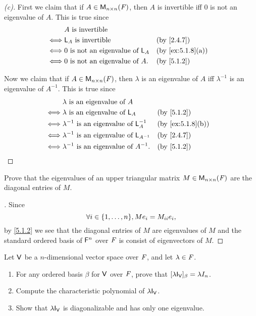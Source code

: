 \begin{proof}[(c)]
	First we claim that if \(A \in \mathsf{M}_{{n} \times n}({\mathit{F}})\), then \(A\) is invertible iff \(0\) is not an eigenvalue of \(A\).
	This is true since
	\begin{align*}
		     & A \text{ is invertible}                                       \\
		\iff & \L_A \text{ is invertible}              &  & \by{2.4.7}       \\
		\iff & 0 \text{ is not an eigenvalue of } \L_A &  & \by{ex:5.1.8}[a] \\
		\iff & 0 \text{ is not an eigenvalue of } A.   &  & \by{5.1.2}
	\end{align*}

	Now we claim that if \(A \in \mathsf{M}_{{n} \times n}({\mathit{F}})\), then \(\lambda\) is an eigenvalue of \(A\) iff \(\lambda^{-1}\) is an eigenvalue of \(A^{-1}\).
	This is true since
	\begin{align*}
		     & \lambda \text{ is an eigenvalue of } A                                      \\
		\iff & \lambda \text{ is an eigenvalue of } \L_A             &  & \by{5.1.2}       \\
		\iff & \lambda^{-1} \text{ is an eigenvalue of } \L_A^{-1}   &  & \by{ex:5.1.8}[b] \\
		\iff & \lambda^{-1} \text{ is an eigenvalue of } \L_{A^{-1}} &  & \by{2.4.7}       \\
		\iff & \lambda^{-1} \text{ is an eigenvalue of } A^{-1}.     &  & \by{5.1.2}
	\end{align*}
\end{proof}

\begin{ex}\label{ex:5.1.9}
	Prove that the eigenvalues of an upper triangular matrix \(M \in \mathsf{M}_{{n} \times n}({\mathit{F}})\) are the diagonal entries of \(M\).
\end{ex}

\begin{proof}[]
	Since
	\[
		\forall i \in \set{1, \dots, n}, M e_i = M_{i i} e_i,
	\]
	by \cref{5.1.2} we see that the diagonal entries of \(M\) are eigenvalues of \(M\) and the standard ordered basis of \(\mathsf{F}^n\) over \(\mathit{F}\) is consist of eigenvectors of \(M\).
\end{proof}

\begin{ex}\label{ex:5.1.10}
	Let \(\mathsf{V}\) be a \(n\)-dimensional vector space over \(\mathit{F}\), and let \(\lambda \in \mathit{F}\).
	\begin{enumerate}
		\item For any ordered basis \(\beta\) for \(\mathsf{V}\) over \(\mathit{F}\), prove that \([\lambda \IT[\V]]_{\beta} = \lambda I_n\).
		\item Compute the characteristic polynomial of \(\lambda \IT[\V]\).
		\item Show that \(\lambda \IT[\V]\) is diagonalizable and has only one eigenvalue.
	\end{enumerate}
\end{ex}

